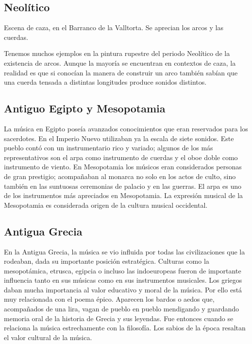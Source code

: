 \subsection{Neolítico}

Escena de caza, en el Barranco de la Valltorta. Se aprecian los arcos y las cuerdas.

Tenemos muchos ejemplos en la pintura rupestre del periodo Neolítico de la existencia de
arcos. Aunque la mayoría se encuentran en contextos de caza, la realidad es que si
conocían la manera de construir un arco también sabían que una cuerda tensada a distintas
longitudes produce sonidos distintos.


\subsection{Antiguo Egipto y Mesopotamia}

La música en Egipto poseía avanzados conocimientos que eran reservados para los
sacerdotes. En el Imperio Nuevo utilizaban ya la escala de siete sonidos. Este pueblo
contó con un instrumentario rico y variado; algunos de los más representativos son el arpa
como instrumento de cuerdas y el oboe doble como instrumento de viento. En Mesopotamia los
músicos eran considerados personas de gran prestigio; acompañaban al monarca no solo en
los actos de culto, sino también en las suntuosas ceremonias de palacio y en las guerras.
El arpa es uno de los instrumentos más apreciados en Mesopotamia. La expresión musical de 
la Mesopotamia es considerada origen de la cultura musical occidental.


\subsection{Antigua Grecia}

En la Antigua Grecia, la música se vio influida por todas las civilizaciones que la
rodeaban, dada su importante posición estratégica. Culturas como la mesopotámica, etrusca,
egipcia o incluso las indoeuropeas fueron de importante influencia tanto en sus músicas
como en sus instrumentos musicales. Los griegos daban mucha importancia al valor educativo
y moral de la música. Por ello está muy relacionada con el poema épico. Aparecen los
bardos o aedos que, acompañados de una lira, vagan de pueblo en pueblo mendigando y
guardando memoria oral de la historia de Grecia y sus leyendas. Fue entonces cuando se
relaciona la música estrechamente con la filosofía. Los sabios de la época resaltan el
valor cultural de la música.


